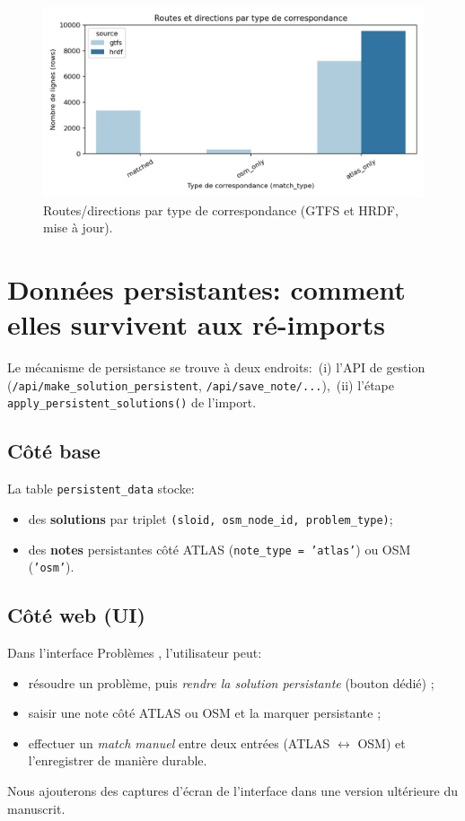 \begin{figure}[h]
  \centering
  \includegraphics[width=0.80\linewidth]{figures/chap7/routes_match_breakdown.png}
  \caption{Routes/directions par type de correspondance (GTFS et HRDF, mise à jour).}
\end{figure}

\section{Données persistantes: comment elles survivent aux ré-imports}
Le mécanisme de persistance se trouve à deux endroits:\ (i) l'API de gestion (\texttt{/api/make\_solution\_persistent}, \texttt{/api/save\_note/...}),\ (ii) l'étape \texttt{apply\_persistent\_solutions()} de l'import.

\subsection*{Côté base}
La table \texttt{persistent\_data} stocke:
\begin{itemize}
  \item des \textbf{solutions} par triplet \texttt{(sloid, osm\_node\_id, problem\_type)};
  \item des \textbf{notes} persistantes côté ATLAS (\texttt{note\_type = 'atlas'}) ou OSM (\texttt{'osm'}).
\end{itemize}

\subsection*{Côté web (UI)}
Dans l'interface \og Problèmes \fg{}, l'utilisateur peut:
\begin{itemize}
  \item résoudre un problème, puis \textit{rendre la solution persistante} (bouton dédié) ;
  \item saisir une note côté ATLAS ou OSM et la marquer persistante ;
  \item effectuer un \textit{match manuel} entre deux entrées (ATLAS $\leftrightarrow$ OSM) et l'enregistrer de manière durable.
\end{itemize}
Nous ajouterons des captures d'écran de l'interface dans une version ultérieure du manuscrit.

